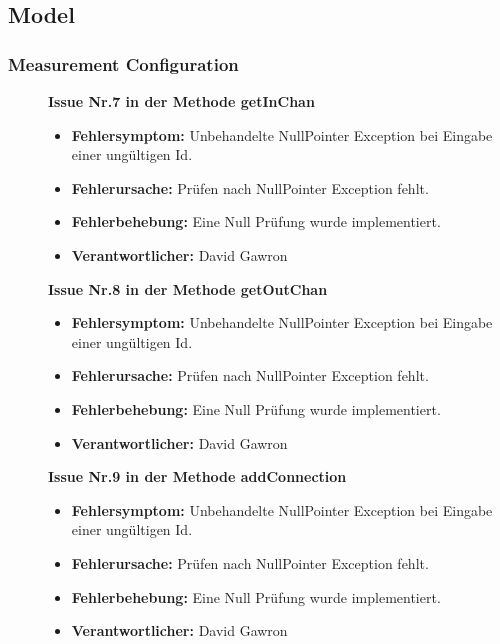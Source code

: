 \documentclass[parskip=full]{scrartcl}
\begin{document}
\clearpage
\subsection{Model}
\subsubsection{Measurement Configuration}

\begin{description}
 

\item []\textbf{Issue Nr.7 in der Methode getInChan} 

\begin{itemize}
\item []\textbf{Fehlersymptom:} Unbehandelte NullPointer Exception bei Eingabe einer ungültigen Id.
\item []\textbf{Fehlerursache:} Prüfen nach NullPointer Exception fehlt.
\item []\textbf{Fehlerbehebung:} Eine Null Prüfung wurde implementiert.
\item []\textbf{Verantwortlicher:} David Gawron
\end{itemize}

\item []\textbf{Issue Nr.8 in der Methode getOutChan} 

\begin{itemize}
\item []\textbf{Fehlersymptom:} Unbehandelte NullPointer Exception bei Eingabe einer ungültigen Id.
\item []\textbf{Fehlerursache:} Prüfen nach NullPointer Exception fehlt.
\item []\textbf{Fehlerbehebung:} Eine Null Prüfung wurde implementiert.
\item []\textbf{Verantwortlicher:} David Gawron
\end{itemize}

\item []\textbf{Issue Nr.9 in der Methode addConnection} 

\begin{itemize}
\item []\textbf{Fehlersymptom:} Unbehandelte NullPointer Exception bei Eingabe einer ungültigen Id.
\item []\textbf{Fehlerursache:} Prüfen nach NullPointer Exception fehlt.
\item []\textbf{Fehlerbehebung:} Eine Null Prüfung wurde implementiert.
\item []\textbf{Verantwortlicher:} David Gawron
\end{itemize}


\end{description}
\end{document}
